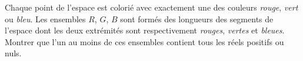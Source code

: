 Chaque point de l'espace est colorié avec exactement une des couleurs \emph{rouge}, \emph{vert} ou \emph{bleu}. Les ensembles $R$, $G$, $B$ sont formés des longueurs des segments de l'espace dont les deux extrémités sont respectivement \emph{rouges}, \emph{vertes} et \emph{bleues}. Montrer que l'un au moins de ces ensembles contient tous les réels positifs ou nuls.
